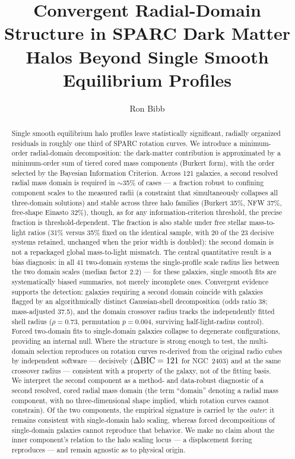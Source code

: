 \documentclass[twocolumn]{aastex701}
\newcommand{\dbic}{\Delta{\rm BIC}}
\begin{document}
\title{Convergent Radial-Domain Structure in SPARC
Dark Matter Halos Beyond Single Smooth Equilibrium Profiles}

\author[0009-0004-1153-2464]{Ron Bibb}

\begin{abstract}
Single smooth equilibrium halo profiles leave statistically significant,
radially organized residuals in roughly one third of SPARC rotation curves.
We introduce a minimum-order radial-domain decomposition: the dark-matter
contribution is approximated by a minimum-order sum of tiered cored mass
components (Burkert form), with the order selected by the Bayesian
Information Criterion. Across 121 galaxies, a second resolved radial mass domain is required
in $\sim$35\% of cases --- a fraction robust to confining component scales to
the measured radii (a constraint that simultaneously collapses all
three-domain solutions) and stable across three halo families (Burkert 35\%,
NFW 37\%, free-shape Einasto 32\%), though, as for any information-criterion
threshold, the precise fraction is threshold-dependent. The fraction is also
stable under free stellar mass-to-light ratios (31\% versus 35\% fixed on
the identical sample, with 20 of the 23 decisive systems retained,
unchanged when the prior width is doubled): the second domain is not a
repackaged global mass-to-light mismatch. The central quantitative result is
a bias diagnosis: in all 41 two-domain systems the single-profile scale
radius lies between the two domain scales (median factor 2.2) --- for these
galaxies, single smooth fits are systematically biased summaries, not merely
incomplete ones. Convergent evidence supports the detection: galaxies
requiring a second domain coincide with galaxies
flagged by an algorithmically distinct Gaussian-shell decomposition (odds ratio
38; mass-adjusted 37.5), and the domain crossover radius tracks the
independently fitted shell radius ($\rho = 0.73$, permutation $p = 0.004$,
surviving half-light-radius control). Forced two-domain fits to single-domain
galaxies collapse to degenerate configurations, providing an internal null.
Where the structure is strong enough to test, the multi-domain selection
reproduces on rotation curves re-derived from the original radio cubes by
independent software --- decisively ($\dbic = 121$ for NGC~2403) and at the
same crossover radius --- consistent with a property of the galaxy,
not of the fitting basis. We interpret the second component as a method- and data-robust diagnostic of
a second resolved, cored radial mass domain (the term ``domain'' denoting a radial mass
component, with no three-dimensional shape implied, which rotation curves
cannot constrain). Of the two components, the empirical signature is carried by
the \emph{outer}: it remains consistent with single-domain halo scaling,
whereas forced decompositions of single-domain galaxies cannot reproduce that
behavior. We make no claim about the inner component's relation to the halo
scaling locus --- a displacement forcing reproduces --- and remain agnostic
as to physical origin.
\end{abstract}
\end{document}
